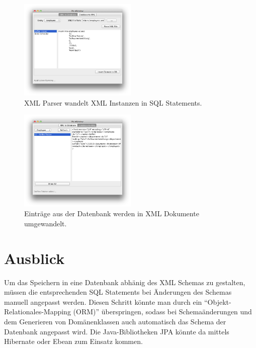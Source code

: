 \documentclass[DIV=calc,paper=a4,fontsize=9pt,twocolumn]{scrartcl}
\begin{document}
\begin{figure}[ht]
    \includegraphics[width=0.5\textwidth ]{app1.png}{}
    \centering
    \caption{XML Parser wandelt XML Instanzen in SQL Statements.}\label{fig:app1}
\end{figure}

\begin{figure}[ht]
    \includegraphics[width=0.5\textwidth ]{app2.png}{}
    \centering
    \caption{Einträge aus der Datenbank werden in XML Dokumente umgewandelt.}\label{fig:app2}
\end{figure}

\section{Ausblick}

Um das Speichern in eine Datenbank abhänig des XML Schemas zu gestalten, müssen die entsprechenden SQL Statements bei Änderungen des Schemas manuell angepasst werden. Diesen Schritt könnte man durch ein \enquote{Objekt-Relationales-Mapping (ORM)} überspringen, sodass bei Schemaänderungen und dem Generieren von Domänenklassen auch automatisch das Schema der Datenbank angepasst wird. Die Java-Bibliotheken JPA könnte da mittels Hibernate oder Ebean zum Einsatz kommen.  \\


\end{document}
